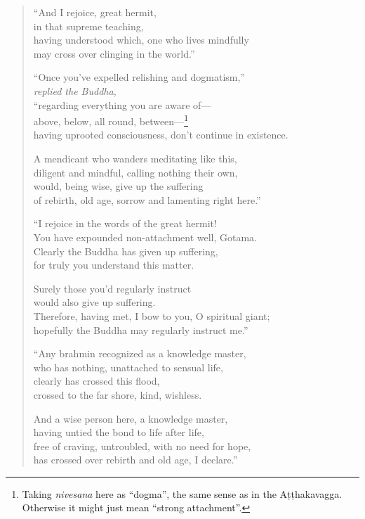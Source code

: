 \documentclass[12pt,openany]{book}%
\newcommand*{\scspeaker}[1]{\hspace{2em}\textit{#1}}
\begin{document}
\begin{verse}
“And I rejoice, great hermit, \\
in that supreme teaching, \\
having understood which, one who lives mindfully \\
may cross over clinging in the world.” 

“Once you’ve expelled relishing and dogmatism,” \\
\scspeaker{replied the Buddha, }\\
“regarding everything you are aware of—\\
above, below, all round, between—\footnote{Taking \textit{nivesana} here as “dogma”, the same sense as in the \textsanskrit{Aṭṭhakavagga}. Otherwise it might just mean “strong attachment”. } \\
having uprooted consciousness, don’t continue in existence. 

A mendicant who wanders meditating like this, \\
diligent and mindful, calling nothing their own, \\
would, being wise, give up the suffering \\
of rebirth, old age, sorrow and lamenting right here.” 

“I rejoice in the words of the great hermit! \\
You have expounded non-attachment well, Gotama. \\
Clearly the Buddha has given up suffering, \\
for truly you understand this matter. 

Surely those you’d regularly instruct \\
would also give up suffering. \\
Therefore, having met, I bow to you, O spiritual giant; \\
hopefully the Buddha may regularly instruct me.” 

“Any brahmin recognized as a knowledge master, \\
who has nothing, unattached to sensual life, \\
clearly has crossed this flood, \\
crossed to the far shore, kind, wishless. 

And a wise person here, a knowledge master, \\
having untied the bond to life after life, \\
free of craving, untroubled, with no need for hope, \\
has crossed over rebirth and old age, I declare.” 

%
\end{verse}
\end{document}
